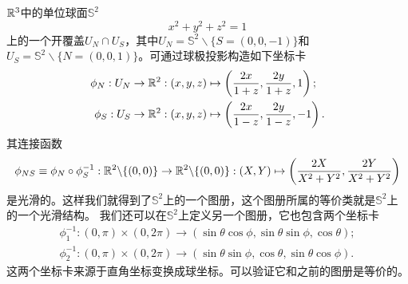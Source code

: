 \begin{example}{}{}
    $\mathbb R^3$中的单位球面$\mathbb S^2$
    \begin{equation}
        x^2+y^2+z^2=1
    \end{equation}
    上的一个开覆盖$U_N\cap U_S$，其中$U_N=\mathbb S^2\backslash\{S=(0,0,-1)\}$和$U_S=\mathbb S^2\backslash\{N=(0,0,1)\}$。可通过球极投影构造如下坐标卡
    \begin{subequations}
        \begin{align}
            \phi_N:U_N\to\mathbb R^2:(x,y,z)&\mapsto\left(\frac{2x}{1+z},\frac{2y}{1+z},1\right);\\
            \phi_S:U_S\to\mathbb R^2:(x,y,z)&\mapsto\left(\frac{2x}{1-z},\frac{2y}{1-z},-1\right).
        \end{align}
    \end{subequations}
    其连接函数
    \begin{equation}
        \phi_{NS}\equiv\phi_N\circ\phi_S^{-1}:\mathbb R^2\backslash\{(0,0)\}\to\mathbb R^2\backslash\{(0,0)\}:(X,Y)\mapsto\left(\frac{2X}{X^2+Y^2},\frac{2Y}{X^2+Y^2}\right)
    \end{equation}
    是光滑的。这样我们就得到了$\mathbb S^2$上的一个图册，这个图册所属的等价类就是$\mathbb S^2$上的一个光滑结构。
    \tcblower
    我们还可以在$\mathbb S^2$上定义另一个图册，它也包含两个坐标卡
    \begin{subequations}
        \begin{align}
            \phi_1^{-1}:(0,\pi)\times(0,2\pi)\to(\sin\theta\cos\phi,\sin\theta\sin\phi,\cos\theta);\\
            \phi_2^{-1}:(0,\pi)\times(0,2\pi)\to(\sin\theta\sin\phi,\cos\theta,\sin\theta\cos\phi).
        \end{align}
    \end{subequations}
    这两个坐标卡来源于直角坐标变换成球坐标。可以验证它和之前的图册是等价的。
\end{example}


